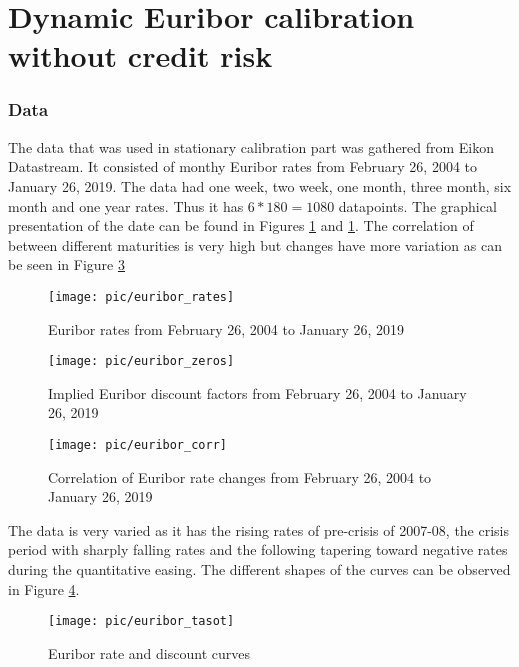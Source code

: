 \section{Dynamic Euribor calibration without credit risk}

\subsubsection{Data}

The data that was used in stationary calibration part was gathered from Eikon Datastream. It consisted of monthy Euribor rates from February 26, 2004 to January 26, 2019. The data had one week, two week, one month, three month, six month and one year rates. Thus it has $6*180=1080$ datapoints. The graphical presentation of the date can be found in Figures \ref{fig:euribor_rates} and \ref{fig:euribor_rates}. The correlation of between different maturities is very high but changes have more variation as can be seen in Figure \ref{fig:euribor_corr}

\begin{figure}[H]
	\centering
	\texttt{[image: pic/euribor\_rates]}
	\caption{Euribor rates from February 26, 2004 to January 26, 2019}
	\label{fig:euribor_rates}
\end{figure} 

\begin{figure}[H]
	\centering
	\texttt{[image: pic/euribor\_zeros]}
	\caption{Implied Euribor discount factors from February 26, 2004 to January 26, 2019}
	\label{fig:euribor_zeros}
\end{figure} 

\begin{figure}[H]
	\centering
	\texttt{[image: pic/euribor\_corr]}
	\caption{Correlation of Euribor rate changes from February 26, 2004 to January 26, 2019}
	\label{fig:euribor_corr}
\end{figure} 

The data is very varied as it has the rising rates of pre-crisis of 2007-08, the crisis period with sharply falling rates and the following tapering toward negative rates during the quantitative easing. The different shapes of the curves can be observed in Figure \ref{fig:euribor_tasot}.

\begin{figure}[H]
	\centering
	\texttt{[image: pic/euribor\_tasot]}
	\caption{Euribor rate and discount curves}
	\label{fig:euribor_tasot}
\end{figure} 


